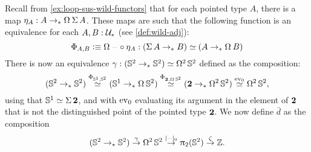 \documentclass[english,a4]{article}
\renewcommand{\ap}[1]{\left[{#1}\right]}
\newcommand{\ptdto}{\to_\ast}%
\newcommand{\settrunc}[1]{\trunc{#1}_0}
\newcommand{\UUptd}{\UU_{\ast}}
\begin{document}
Recall from \cref{ex:loop-sus-wild-functors} that for each pointed type $A$,
there is a map $\eta_A : A \ptdto \loopspace\null \susp A$. These maps are such
that the following function is an equivalence for each $A,B:\UUptd$ (see
\cref{def:wild-adj}):
\begin{equation}
  \Phi_{A,B} \defequi \loopspace \null \blank \circ \eta_A :  (\susp A \ptdto B) \weq (A \ptdto \loopspace \null B)
  \label{eq:triangle-identity-unit}
\end{equation}
There is now an equivalence $\gamma:(\Sp \ptdto \Sp) \weq \loopspace 2 \Sp$ defined as
the composition:
\begin{displaymath}
  (\Sp \ptdto \Sp) \stackrel{\Phi_{\Sc,\Sp}}\weq 
  (\Sc \ptdto\loopspace\null \Sp) \stackrel{\Phi_{\bn 2,\loopspace\null\Sp}}\weq 
  (\bn 2\ptdto\loopspace 2 \Sp) \stackrel{\ev_0}\weq 
  \loopspace 2 \Sp,
\end{displaymath}
using that ${{\mathbb S^{1}}} \simeq \operatorname{\Sigma}{\mathbf{2}}$, and with $\mathrm{ev}_0$ evaluating its argument 
in the element of $\mathbf{2}$ that is not the distinguished point of the pointed type $\mathbf{2}$.					
We now define $\bar d$ as the composition
\begin{displaymath}
  (\Sp \ptdto \Sp) \stackrel \gamma \to \loopspace 2 \Sp \stackrel {\settrunc\blank} \to 
  \hgr 2(\Sp) \stackrel \zeta \to \ZZ.
\end{displaymath}
\end{document}
